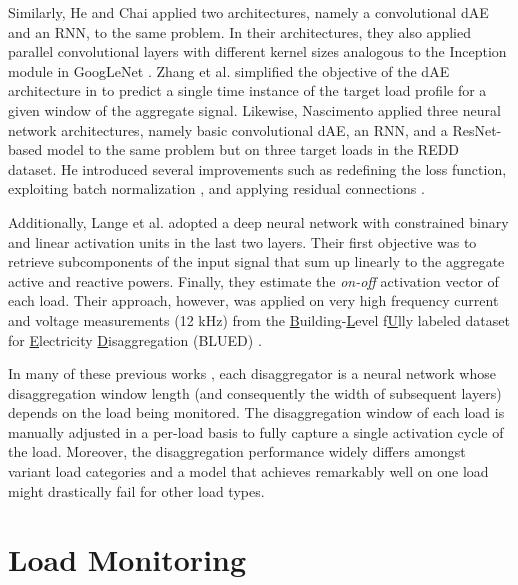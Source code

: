 \documentclass[twocolumn,letter,10pt]{IEEEtran} %
\begin{document}
Similarly, He and Chai \cite{He_2016_AnEmpiricalStudy} applied two architectures, namely a convolutional dAE and an RNN, to the same problem. In their architectures, they also applied parallel convolutional layers with different kernel sizes analogous to the Inception module in GoogLeNet \cite{Szegedy_2015}. Zhang et al. \cite{Zhang_2016_SequenceToPointLearning} simplified the objective of the dAE architecture in \cite{Kelly_2015} to predict a single time instance of the target load profile for a given window of the aggregate signal.
Likewise, Nascimento \cite{Nascimento_2016} applied three neural network architectures, namely basic convolutional dAE, an RNN, and a ResNet-based model \cite{He_2015_ResNet} to the same problem but on three target loads in the REDD dataset. He introduced several improvements such as redefining the loss function, exploiting batch normalization \cite{Ioffe_2015_BatchNormalization}, and applying residual connections \cite{He_2015_ResNet}.

Additionally, Lange et al. \cite{Lange_2016_BOLT} adopted a deep neural network with constrained binary and linear activation units in the last two layers. Their first objective was to retrieve subcomponents of the input signal that sum up linearly to the aggregate active and reactive powers. Finally, they estimate the \emph{on-off} activation vector of each load. Their approach, however, was applied on very high frequency current and voltage measurements (12 kHz) from the \underline{B}uilding-\underline{L}evel f\underline{U}lly labeled dataset for \underline{E}lectricity \underline{D}isaggregation (BLUED) \cite{Anderson_2012_BLUED}.

In many of these previous works \cite{Kelly_2015, He_2016_AnEmpiricalStudy, Zhang_2016_SequenceToPointLearning, Nascimento_2016}, each disaggregator is a neural network whose disaggregation window length (and consequently the width of subsequent layers) depends on the load being monitored. The disaggregation window of each load is manually adjusted in a per-load basis to fully capture a single activation cycle of the load. Moreover, the disaggregation performance widely differs amongst variant load categories and a model that achieves remarkably well on one load might drastically fail for other load types.



\section{Load Monitoring}
\label{sec:load-monitoring}
\end{document}
